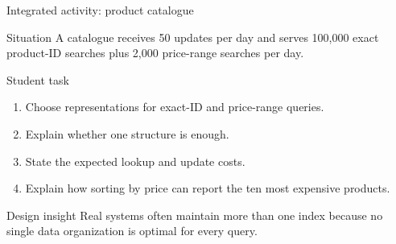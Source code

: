 \documentclass[aspectratio=169]{beamer}
\begin{document}
\begin{frame}{Integrated activity: product catalogue}
  \begin{block}{Situation}
    A catalogue receives 50 updates per day and serves 100,000 exact product-ID
    searches plus 2,000 price-range searches per day.
  \end{block}
  \begin{alertblock}{Student task}
    \begin{enumerate}
      \item Choose representations for exact-ID and price-range queries.
      \item Explain whether one structure is enough.
      \item State the expected lookup and update costs.
      \item Explain how sorting by price can report the ten most expensive products.
    \end{enumerate}
  \end{alertblock}
  \begin{exampleblock}{Design insight}
    Real systems often maintain more than one index because no single data
    organization is optimal for every query.
  \end{exampleblock}
\end{frame}
\end{document}
